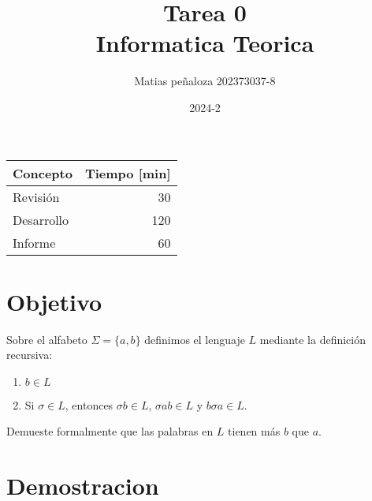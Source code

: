 \documentclass[spanish, draft]{article}
\begin{document}
\title{
    Tarea 0 \\
    Informatica Teorica
}
\author{
    Matias peñaloza
    202373037-8
}
\date{
    2024-2
}
\maketitle

\begin{center}
        \begin{tabular}{|l|r|}
          \hline
          \multicolumn{1}{|c|}{\textbf{Concepto}} &
            \multicolumn{1}{c|}{\textbf{Tiempo [min]}} \\
          \hline
          Revisión & 30\\
          \hline
          Desarrollo    & 120\\
          \hline
          Informe	      & 60\\
          \hline
        \end{tabular}
      \end{center}

\section*{Objetivo}
    Sobre el alfabeto \(\Sigma = \{a, b\}\)
    definimos el lenguaje \(L\)
    mediante la definición recursiva:
    \begin{enumerate}
        \item{ \(b \in L\) }
        \item{Si \(\sigma \in L \), entonces \(\sigma b \in L\), \(\sigma a b \in L\) y \(b \sigma a \in L\). }
    \end{enumerate}
    Demueste formalmente que las palabras en \(L\) tienen más \(b\) que \(a\).

\section*{Demostracion}
\end{document}
